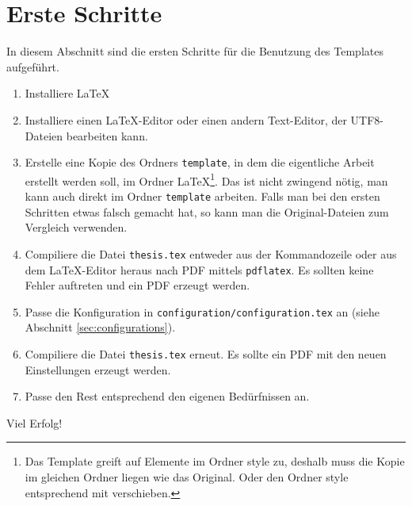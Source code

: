 %
\section{Erste Schritte}
In diesem Abschnitt sind die ersten Schritte für die Benutzung des Templates aufgeführt.
\begin{enumerate}
\item Installiere \LaTeX
\item Installiere einen \LaTeX-Editor oder einen andern Text-Editor, der UTF8-Dateien bearbeiten kann.
\item Erstelle eine Kopie des Ordners \texttt{template}, in dem die eigentliche Arbeit erstellt werden soll, im Ordner LaTeX\footnote{Das Template greift auf Elemente im Ordner style zu, deshalb muss die Kopie im gleichen Ordner liegen wie das Original. Oder den Ordner style entsprechend mit verschieben.}. Das ist nicht zwingend nötig, man kann auch direkt im Ordner \texttt{template} arbeiten. Falls man bei den ersten Schritten etwas falsch gemacht hat, so kann man die Original-Dateien zum Vergleich verwenden.
\item Compiliere die Datei \texttt{thesis.tex} entweder aus der Kommandozeile oder aus dem \LaTeX-Editor heraus nach PDF mittels \texttt{pdflatex}. Es sollten keine Fehler auftreten und ein PDF erzeugt werden.
\item Passe die Konfiguration in \texttt{configuration/configuration.tex} an (siehe Abschnitt \ref{sec:configurations}).
\item Compiliere die Datei \texttt{thesis.tex} erneut. Es sollte ein PDF mit den neuen Einstellungen erzeugt werden.
\item Passe den Rest entsprechend den eigenen Bedürfnissen an.
\end{enumerate}

Viel Erfolg!
